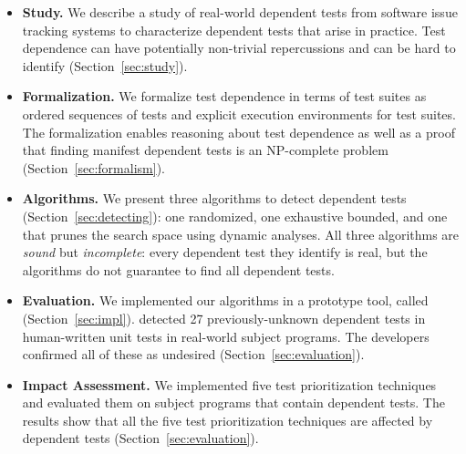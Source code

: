 \begin{itemize}

  \item \textbf{Study.} We describe a study of \dtnum real-world
  dependent tests from \repnum software issue tracking
  systems to characterize dependent tests that
  arise in practice.  Test dependence can have
  potentially non-trivial repercussions and can be hard to identify
  (Section~\ref{sec:study}).

\item \textbf{Formalization.} We formalize test dependence
  in terms of test suites as ordered sequences of tests and explicit execution
  environments for test suites.  The formalization enables reasoning about test dependence
  as well as a proof that finding manifest dependent tests is an NP-complete
  problem (Section~\ref{sec:formalism}).

  \item \textbf{Algorithms.} We present three algorithms
  to detect dependent tests (Section~\ref{sec:detecting}):
  one randomized, one exhaustive bounded, and one that prunes the search
  space using dynamic analyses.
  All three algorithms are \emph{sound} but \emph{incomplete}:
  every dependent test they identify is real, but the algorithms
  do not guarantee to find all dependent tests. 

  \item \textbf{Evaluation.} We implemented our algorithms in a prototype
  tool, called \ourtool (Section~\ref{sec:impl}).
  \ourtool detected 27 previously-unknown dependent tests in human-written
  unit tests in \subjnum real-world subject programs.
  The developers confirmed all of these as
  undesired (Section~\ref{sec:evaluation}).

  \item \textbf{Impact Assessment.} We implemented five test prioritization
  techniques and evaluated them on \subjnum subject programs
  that contain dependent tests. The results show that all the
  five test prioritization techniques are affected by dependent tests
  (Section~\ref{sec:evaluation}).

\end{itemize}



